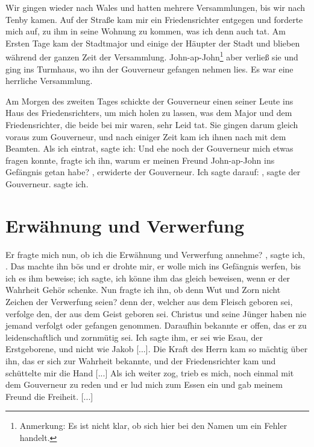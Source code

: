 Wir gingen wieder nach Wales und hatten mehrere 
Versammlungen, bis wir nach Tenby kamen. Auf der Straße kam
mir ein Friedensrichter entgegen und forderte mich auf, zu ihm
in seine Wohnung zu kommen, was ich denn auch tat. Am
Ersten Tage kam der Stadtmajor und einige der Häupter der
Stadt und blieben während der ganzen Zeit der Versammlung.
John-ap-John\footnote{Anmerkung: Es ist nicht klar, ob sich 
hier bei den Namen um ein Fehler handelt.} 
aber verließ sie und ging ins Turmhaus, wo ihn
der Gouverneur gefangen nehmen lies. Es war eine herrliche
Versammlung. 

Am Morgen des zweiten Tages schickte der 
Gouverneur einen seiner Leute ins Haus des Friedensrichters, um mich
holen zu lassen, was dem Major und dem Friedensrichter, die
beide bei mir waren, sehr Leid tat. Sie gingen darum gleich
voraus zum Gouverneur, und nach einiger Zeit kam ich ihnen nach
mit dem Beamten. Als ich eintrat, sagte ich:  Und ehe noch der Gouverneur mich etwas fragen konnte,
fragte ich ihn, warum er meinen Freund John-ap-John ins 
Gefängnis getan habe? , erwiderte der Gouverneur. 
Ich sagte darauf:  , sagte der Gouverneur.  sagte ich. 

\section{Erwähnung und Verwerfung}

Er fragte mich nun, ob ich die Erwähnung und Verwerfung annehme?
, sagte ich, .
 Das machte
ihn bös und er drohte mir, er wolle mich ins Gefängnis werfen,
bis ich es ihm beweise; ich sagte, ich könne ihm das gleich beweisen,
wenn er der Wahrheit Gehör schenke.  
Nun fragte ich ihn, ob denn
Wut und Zorn nicht Zeichen der Verwerfung seien? denn der,
welcher aus dem Fleisch geboren sei, verfolge den, der aus dem
Geist geboren sei. Christus und seine Jünger haben nie jemand
verfolgt oder gefangen genommen. Daraufhin bekannte er offen,
das er zu leidenschaftlich und zornmütig sei. Ich sagte ihm, er
sei wie Esau, der Erstgeborene, und nicht wie Jakob [...]. Die
Kraft des Herrn kam so mächtig über ihn, das er sich zur 
Wahrheit bekannte, und der Friedensrichter kam und schüttelte mir
die Hand [...] Als ich weiter zog, trieb es mich, noch einmal
mit dem Gouverneur zu reden und er lud mich zum Essen ein
und gab meinem Freund die Freiheit. [...] 


